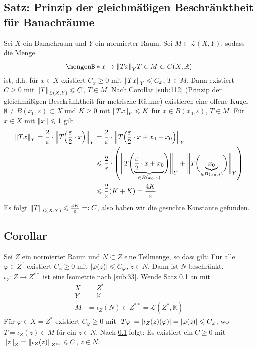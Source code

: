 \subsection{Satz: Prinzip der gleichmäßigen Beschränktheit für Banachräume} %
\label{sub:35}
Sei $X$ ein Banachraum und $Y$ ein normierter Raum. Sei $M \subset \mathcal{L}(X,Y)$, sodass die Menge 
\[
	\set[{x \mapsto \norm[Y]{T x}}]{T \in M \rule{0cm}{1em}} \subset C(X,\mathds{R} )
\]
 ist, d.h. für $x \in X$ existiert $C_x \ge 0$ mit $\norm[Y]{T x} \le C_x$, $T \in M$. Dann existiert $C \ge 0$ mit 
$\norm[\mathcal{L}(X,Y)]{T} \le C$, $T \in M$.
Nach Corollar \ref{sub:112} (Prinzip der gleichmäßigen Beschränktheit für metrische Räume) existieren eine offene Kugel $\emptyset \not= B(x_0,\varepsilon)\subset X$ und 
$K \ge 0$ mit $\norm[Y]{T x} \le K$ für $x \in B(x_0, \varepsilon)$, $T \in M$. Für $x \in X$ mit $\norm{x} \le 1$ gilt 
\begin{align*}
	\norm[Y]{T x} = \frac{2}{\varepsilon} \cdot  \norm[Y]{T \enbrace*{\frac{\varepsilon}{2} \cdot x}} &= \frac{2}{\varepsilon} \cdot 
	\norm[Y]{T \enbrace*{\frac{\varepsilon}{2} \cdot x + x_0 - x_0 } }  \\
	&\le \frac{2}{\varepsilon} \cdot   \enbrace*{ \doppelstrich[\Bigg]{T \enbrace[\Bigg]{\underbrace{\frac{\varepsilon}{2} \cdot x + x_0}_{\in B(x_0,\varepsilon)} } }_Y +
	 \doppelstrich[\Bigg]{T  \enbrace[\bigg]{\underbrace{x_0}_{\in B(x_0,\varepsilon)}}}_Y} \\
	&\le \frac{2}{\varepsilon} (K+K) = \frac{4K}{\varepsilon}   
\end{align*}
Es folgt $\norm[\mathcal{L}(X,Y)]{T} \le \frac{4 K}{\varepsilon} =: C$, also haben wir die gesuchte Konstante gefunden. \bewende

\subsection[Corollar über Beschränktheit einer Teilmenge eines normierten Raumes]{Corollar} %
\label{sub:36}
Sei $Z$ ein normierter Raum und $N \subset Z$ eine Teilmenge, so dass gilt: Für alle $\varphi \in Z^*$ existiert $C_\varphi \ge 0$ mit $\abs*{\varphi(z)} \le C_\varphi$, 
$z \in N$.  Dann ist $N$ beschränkt.
$\iota_Z \colon Z \to Z^{**}$ ist eine Isometrie nach \ref{sub:33}. Wende Satz \ref{sub:35} an mit 
\begin{align*}
	X &=Z^{*} \\
	Y &=\mathds{K} \\
	M &= \iota_Z(N) \subset Z^{**}= \mathcal{L}(Z^*,\mathds{K})
\end{align*}
Für $\varphi \in X = Z^{*}$ existiert $C_\varphi \ge 0$ mit $\abs*{T \varphi} = \abs*{\iota_Z(z) (\varphi)} = \abs*{\varphi(z)} \le C_\varphi$, wo $T= \iota_Z(z) \in M$
für ein $z \in N$. Nach \ref{sub:35} folgt: Es existiert ein $C \ge 0$ mit $\norm[Z]{z} = \norm[Z^{**}]{\iota_Z(z)}  \le C$, $z \in N$. \bewende

